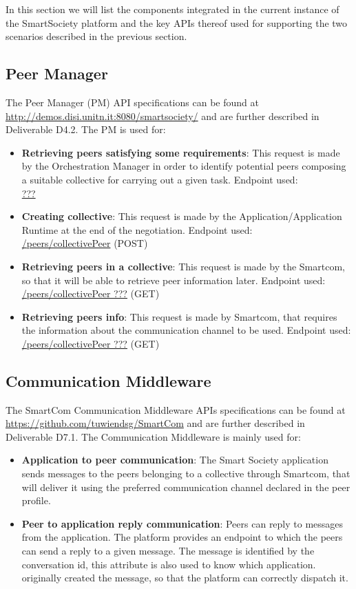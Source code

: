 In this section we will list the components integrated in the current
instance of the SmartSociety platform and the key APIs thereof
used for supporting the two scenarios described in the previous
section.

\subsection{Peer Manager}
The Peer Manager (PM) API specifications can be found at
\url{http://demos.disi.unitn.it:8080/smartsociety/} and are further
described in Deliverable D4.2. The PM is used for:
\begin{itemize}
\item {\bf Retrieving peers satisfying some requirements}: This
  request is made by the Orchestration Manager in order to identify
  potential peers composing a suitable collective for carrying out a
  given task. Endpoint used:\\
	\url{???}
\item {\bf Creating collective}: This request is made by the Application/Application Runtime at the end of the negotiation. Endpoint used:\\
	\url{/peers/collectivePeer} (\textsc{POST})
\item {\bf Retrieving peers in a collective}: This request is made by the Smartcom, so that it will be able to retrieve peer information later. Endpoint used:\\
	\url{/peers/collectivePeer ???} (\textsc{GET})
\item {\bf Retrieving peers info}: This request is made by Smartcom, that requires the information about the communication channel to be used. Endpoint used:\\
	\url{/peers/collectivePeer ???} (\textsc{GET})	
\end{itemize}


\subsection{Communication Middleware}
The SmartCom Communication Middleware APIs specifications can be found at 
\url{https://github.com/tuwiendsg/SmartCom} and are further described in Deliverable D7.1. The Communication Middleware is mainly used for:
\begin{itemize}
\item {\bf Application to peer communication}: The Smart Society application sends messages to the peers belonging to a collective through Smartcom, that will deliver it using the preferred communication channel declared in the peer profile.
\item {\bf Peer to application reply communication}: Peers can reply to messages from the application. The platform provides an endpoint to which the peers can send a reply to a given message. The message is identified by the conversation id, this attribute is also used to know which application.
originally created the message, so that the platform can correctly dispatch it. 
\end{itemize}

